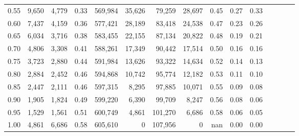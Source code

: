 \begin{tabular}{rrrcrrrrrrrrrrr}
0.55 &    9,650 &  4,779 &                                       0.33 &  569,984 &   35,626 &   79,259 &   28,697 &  0.45 &  0.27 &                         0.33 \\
0.60 &    7,437 &  4,159 &                                       0.36 &  577,421 &   28,189 &   83,418 &   24,538 &  0.47 &  0.23 &                         0.26 \\
0.65 &    6,034 &  3,716 &                                       0.38 &  583,455 &   22,155 &   87,134 &   20,822 &  0.48 &  0.19 &                         0.21 \\
0.70 &    4,806 &  3,308 &                                       0.41 &  588,261 &   17,349 &   90,442 &   17,514 &  0.50 &  0.16 &                         0.16 \\
0.75 &    3,723 &  2,880 &                                       0.44 &  591,984 &   13,626 &   93,322 &   14,634 &  0.52 &  0.14 &                         0.13 \\
0.80 &    2,884 &  2,452 &                                       0.46 &  594,868 &   10,742 &   95,774 &   12,182 &  0.53 &  0.11 &                         0.10 \\
0.85 &    2,447 &  2,111 &                                       0.46 &  597,315 &    8,295 &   97,885 &   10,071 &  0.55 &  0.09 &                         0.08 \\
0.90 &    1,905 &  1,824 &                                       0.49 &  599,220 &    6,390 &   99,709 &    8,247 &  0.56 &  0.08 &                         0.06 \\
0.95 &    1,529 &  1,561 &                                       0.51 &  600,749 &    4,861 &  101,270 &    6,686 &  0.58 &  0.06 &                         0.05 \\
1.00 &    4,861 &  6,686 &                                       0.58 &  605,610 &        0 &  107,956 &        0 &   nan &  0.00 &                         0.00 \\
\bottomrule
\end{tabular}
